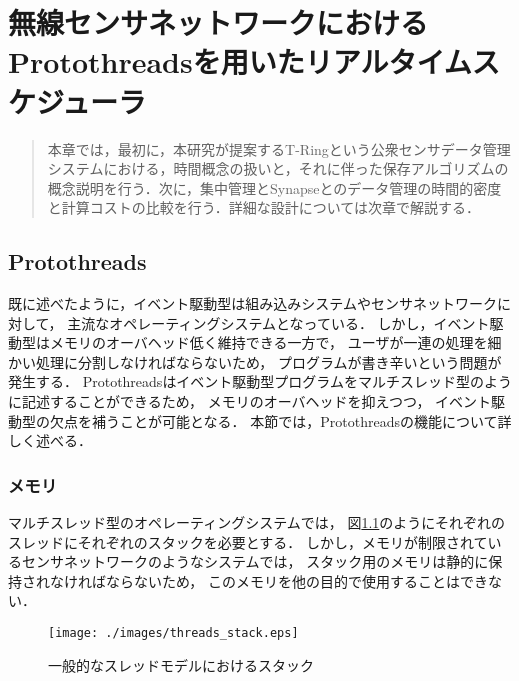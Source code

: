 \chapter{無線センサネットワークにおけるProtothreadsを用いたリアルタイムスケジューラ}
\begin{large}
\begin{quote}
本章では，最初に，本研究が提案するT-Ringという公衆センサデータ管理システムにおける，時間概念の扱いと，それに伴った保存アルゴリズムの概念説明を行う．次に，集中管理とSynapseとのデータ管理の時間的密度と計算コストの比較を行う．詳細な設計については次章で解説する．

\end{quote}
\end{large}
\clearpage

\section{Protothreads}
既に述べたように，イベント駆動型は組み込みシステムやセンサネットワークに対して，
主流なオペレーティングシステムとなっている．
しかし，イベント駆動型はメモリのオーバヘッド低く維持できる一方で，
ユーザが一連の処理を細かい処理に分割しなければならないため，
プログラムが書き辛いという問題が発生する．
Protothreads\cite{Dunkels:2006:PSE:1182807.1182811}はイベント駆動型プログラムをマルチスレッド型のように記述することができるため，
メモリのオーバヘッドを抑えつつ，
イベント駆動型の欠点を補うことが可能となる．
本節では，Protothreadsの機能について詳しく述べる．

\subsection{メモリ}
マルチスレッド型のオペレーティングシステムでは，
図\ref{fig:threads_stack}のようにそれぞれのスレッドにそれぞれのスタックを必要とする．
しかし，メモリが制限されているセンサネットワークのようなシステムでは，
スタック用のメモリは静的に保持されなければならないため，
このメモリを他の目的で使用することはできない．
\begin{figure}[htbp]
 \begin{center}
  \texttt{[image: ./images/threads\_stack.eps]}
 \end{center}
 \caption{一般的なスレッドモデルにおけるスタック}
 \label{fig:threads_stack}
\end{figure}

